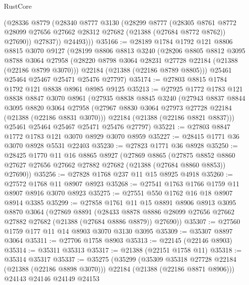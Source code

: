 \begin{lexlean}{RustCore}
\begin{coremodule}
          (@28336
            @8779
            (@28340
              @8777
              @3130
              (@28299
                @8777
                (@28305
                  @8761
                  @8772
                  @28099
                  @27656
                  @27662
                  @28312
                  @27682
                  (@21388 (@27684 @8772 @8762))
                  @27690))
              @27837))
          @24493)))
@35166 := @28189
    @1784
    @1792
    @121
    @8806
    @8815
    @3070
    @9127
    (@28199
      @8806
      @8813
      @3240
      (@28206
        @8805
        @8812
        @3095
        @8788
        @3064
        @27958
        (@28220 @8798 @3064 @28231 @27728 @22184 (@21388 (@22186 @8799 @3070)))
        @22184
        (@21388 (@22186 @8789 @8805)))
      @25461
      @25464
      @25467
      @25471
      @25476
      @27797)
@35174 := @27803 @8815 @1784 @1792 @121 @8838 @8961 @8985 @9125
@35213 := @27925
    @1772
    @1783
    @121
    @8838
    @8847
    @3070
    @8961
    (@27935
      @8838
      @8845
      @3240
      (@27943
        @8837
        @8844
        @3095
        @8820
        @3064
        @27958
        (@27967 @8830 @3064 @27973 @27728 @22184 (@21388 (@22186 @8831 @3070)))
        @22184
        (@21388 (@22186 @8821 @8837)))
      @25461
      @25464
      @25467
      @25471
      @25476
      @27797)
@35221 := @27803 @8847 @1772 @1783 @121 @3070 @8929 @3070 @8959
@35227 := @28415 @1771 @36 @3070 @8928 @5531 @22403
@35230 := @27823 @1771 @36 @8928
@35250 := @28425
    @1770
    @11
    @16
    @8865
    @8927
    (@27869
      @8865
      (@27875 @8852 @8860 @27627 @27656 @27662 @27882 @27682 (@21388 (@27684 @8860 @8853)) @27690))
@35256 := @27828 @1768 @237 @11 @15 @8925 @4918
@35260 := @27572 @1768 @11 @8907 @8923
@35268 := @27541 @1763 @1766 @1759 @11 @8907 @8916 @3070 @8923
@35275 := @27551 @550 @1762 @16 @18 @8907 @8914 @3385
@35299 := @27858
    @1761
    @11
    @15
    @8891
    @8906
    @8913
    @3095
    @8870
    @3064
    (@27869
      @8891
      (@28433 @8878 @8886 @28099 @27656 @27662 @27882 @27682 (@21388 (@27684 @8886 @8879)) @27690))
@35307 := @27560 @1759 @177 @11 @14 @8903 @3070 @3130 @3095
@35309 := @35307 @8897 @3064
@35311 := @27706 @1758 @8903
@35313 := @22145 (@22146 @8903)
@35314 := @35311 @35313
@35317 := @21388 (@22151 @1758 @11)
@35318 := @35314 @35317
@35337 := @35275
    (@35299
      (@35309 @35318 @27728 @22184 (@21388 (@22186 @8898 @3070)))
      @22184
      (@21388 (@22186 @8871 @8906)))
    @24143
    @24146
    @24149
    @24153

\end{coremodule}
\end{lexlean}
